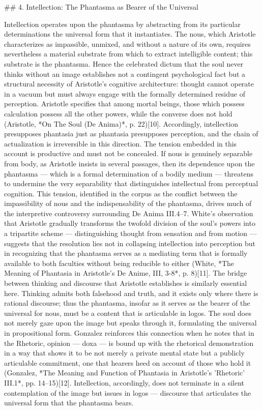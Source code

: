 ## 4. Intellection: The Phantasma as Bearer of the Universal

Intellection operates upon the phantasma by abstracting from its particular determinations the universal form that it instantiates. The nous, which Aristotle characterizes as impassible, unmixed, and without a nature of its own, requires nevertheless a material substrate from which to extract intelligible content; this substrate is the phantasma. Hence the celebrated dictum that the soul never thinks without an image establishes not a contingent psychological fact but a structural necessity of Aristotle's cognitive architecture: thought cannot operate in a vacuum but must always engage with the formally determined residue of perception. Aristotle specifies that among mortal beings, those which possess calculation possess all the other powers, while the converse does not hold (Aristotle, *On The Soul (De Anima)*, p. 22)[10]. Accordingly, intellection presupposes phantasia just as phantasia presupposes perception, and the chain of actualization is irreversible in this direction. The tension embedded in this account is productive and must not be concealed. If nous is genuinely separable from body, as Aristotle insists in several passages, then its dependence upon the phantasma — which is a formal determination of a bodily medium — threatens to undermine the very separability that distinguishes intellectual from perceptual cognition. This tension, identified in the corpus as the conflict between the impassibility of nous and the indispensability of the phantasma, drives much of the interpretive controversy surrounding De Anima III.4–7. White's observation that Aristotle gradually transforms the twofold division of the soul's powers into a tripartite scheme — distinguishing thought from sensation and from motion — suggests that the resolution lies not in collapsing intellection into perception but in recognizing that the phantasma serves as a mediating term that is formally available to both faculties without being reducible to either (White, *The Meaning of Phantasia in Aristotle's De Anime, III, 3-8*, p. 8)[11]. The bridge between thinking and discourse that Aristotle establishes is similarly essential here. Thinking admits both falsehood and truth, and it exists only where there is rational discourse; thus the phantasma, insofar as it serves as the bearer of the universal for nous, must be a content that is articulable in logos. The soul does not merely gaze upon the image but speaks through it, formulating the universal in propositional form. Gonzalez reinforces this connection when he notes that in the Rhetoric, opinion — doxa — is bound up with the rhetorical demonstration in a way that shows it to be not merely a private mental state but a publicly articulable commitment, one that hearers heed on account of those who hold it (Gonzalez, *The Meaning and Function of Phantasia in Aristotle's 'Rhetoric' III.1*, pp. 14–15)[12]. Intellection, accordingly, does not terminate in a silent contemplation of the image but issues in logos — discourse that articulates the universal form that the phantasma bears. 

